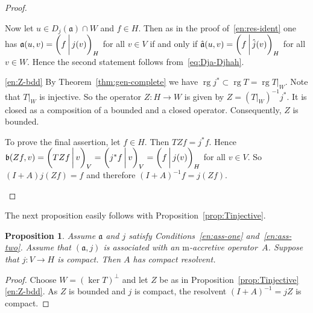 \documentclass[a4paper,oneside,12pt]{amsart}
\theoremstyle{plain}
\newtheorem{proposition}[theorem]{Proposition}
\theoremstyle{definition}
\begin{document}
\begin{proof}
\begin{asparaenum}
Now let $u\in D_j({{\mathfrak{{a}}}})\cap W$ and $f\in H$. Then as in the proof of~\ref{en:res-ident} one has
${{\mathfrak{{a}}}}(u,v)={{\ifthenelse{\equal{auto}{auto}}{\left({f}\mkern3mu{\biggm|}\mkern3mu {j(v)}\right)}{}
\ifthenelse{\equal{auto}{b}}{\bigl({f}\mkern3mu{\biggm|}\mkern3mu {j(v)}\bigr)}{}
\ifthenelse{\equal{auto}{B}}{\Bigl({f}\mkern3mu{\bigm|}\mkern3mu {j(v)}\Bigr)}{}
}}_H$ for all $v\in V$ if and only if
${{\mathfrak{{\hat{a}}}}}(u,v)={{\ifthenelse{\equal{auto}{auto}}{\left({f}\mkern3mu{\biggm|}\mkern3mu {\smash{\hat{j}}(v)}\right)}{}
\ifthenelse{\equal{auto}{b}}{\bigl({f}\mkern3mu{\biggm|}\mkern3mu {\smash{\hat{j}}(v)}\bigr)}{}
\ifthenelse{\equal{auto}{B}}{\Bigl({f}\mkern3mu{\bigm|}\mkern3mu {\smash{\hat{j}}(v)}\Bigr)}{}
}}_H$ for all $v\in W$. 
Hence the second statement follows from~\eqref{eq:Dja-Djhah}.

\item[\ref{en:Z-bdd}]
By Theorem~\ref{thm:gen-complete} we have $\operatorname{rg} j^*\subset\operatorname{rg} T=\operatorname{rg}{\ensuremath{{T}|_{{W}}}}$.
Note that ${\ensuremath{{T}|_{{W}}}}$ is injective.
So the operator $Z\colon H\to W$ is given by $Z=({\ensuremath{{T}|_{{W}}}})^{-1}j^*$. It is closed as a composition of a
bounded and a closed operator. Consequently, $Z$ is bounded.

To prove the final assertion, let $f\in H$. Then $TZf=j^*f$.
Hence ${{\mathfrak{{b}}}}(Zf,v)={{\ifthenelse{\equal{auto}{auto}}{\left({TZf}\mkern3mu{\biggm|}\mkern3mu {v}\right)}{}
\ifthenelse{\equal{auto}{b}}{\bigl({TZf}\mkern3mu{\biggm|}\mkern3mu {v}\bigr)}{}
\ifthenelse{\equal{auto}{B}}{\Bigl({TZf}\mkern3mu{\bigm|}\mkern3mu {v}\Bigr)}{}
}}_V={{\ifthenelse{\equal{auto}{auto}}{\left({j^*f}\mkern3mu{\biggm|}\mkern3mu {v}\right)}{}
\ifthenelse{\equal{auto}{b}}{\bigl({j^*f}\mkern3mu{\biggm|}\mkern3mu {v}\bigr)}{}
\ifthenelse{\equal{auto}{B}}{\Bigl({j^*f}\mkern3mu{\bigm|}\mkern3mu {v}\Bigr)}{}
}}_V={{\ifthenelse{\equal{auto}{auto}}{\left({f}\mkern3mu{\biggm|}\mkern3mu {j(v)}\right)}{}
\ifthenelse{\equal{auto}{b}}{\bigl({f}\mkern3mu{\biggm|}\mkern3mu {j(v)}\bigr)}{}
\ifthenelse{\equal{auto}{B}}{\Bigl({f}\mkern3mu{\bigm|}\mkern3mu {j(v)}\Bigr)}{}
}}_H$ for all $v\in V$.
So $(I+A)j(Zf)=f$ and therefore
$(I+A)^{-1}f = j (Zf)$.
\qedhere
\end{asparaenum}
\end{proof}

The next proposition easily follows with Proposition~\ref{prop:Tinjective}.
\begin{proposition}
Assume ${{\mathfrak{{a}}}}$ and $j$ satisfy Conditions~\ref{en:ass-one} and~\ref{en:ass-two}.
Assume that $({{\mathfrak{{a}}}},j)$ is associated with an {\ensuremath{\text{m}}}-accretive operator~$A$.
Suppose that $j\colon V\to H$ is compact. Then $A$ has compact resolvent.
\end{proposition}
\begin{proof}
Choose $W=(\ker T)^\perp$ and let $Z$ be as in Proposition~\ref{prop:Tinjective}\,\ref{en:Z-bdd}. As $Z$ is bounded and $j$ is compact,
the resolvent $(I+A)^{-1}=jZ$ is compact.
\end{proof}
\end{document}
